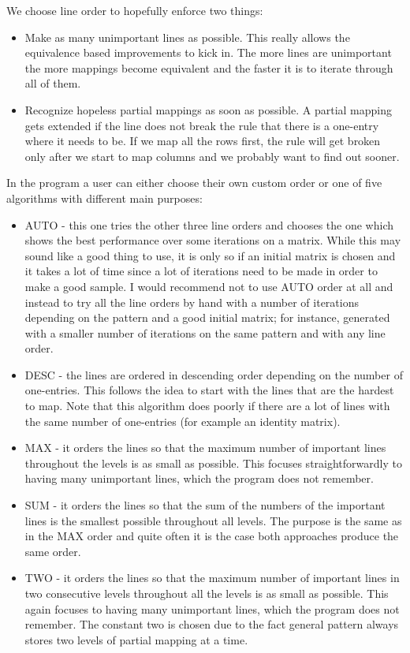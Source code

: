 We choose line order to hopefully enforce two things:
\begin{itemize}
\item Make as many unimportant lines as possible. This really allows the equivalence based improvements to kick in. The more lines are unimportant the more mappings become equivalent and the faster it is to iterate through all of them.
\item Recognize hopeless partial mappings as soon as possible. A partial mapping gets extended if the line does not break the rule that there is a one-entry where it needs to be. If we map all the rows first, the rule will get broken only after we start to map columns and we probably want to find out sooner.\\
\end{itemize}
In the program a user can either choose their own custom order or one of five algorithms with different main purposes:
\begin{itemize}
\item AUTO - this one tries the other three line orders and chooses the one which shows the best performance over some iterations on a matrix. While this may sound like a good thing to use, it is only so if an initial matrix is chosen and it takes a lot of time since a lot of iterations need to be made in order to make a good sample. I would recommend not to use AUTO order at all and instead to try all the line orders by hand with a number of iterations depending on the pattern and a good initial matrix; for instance, generated with a smaller number of iterations on the same pattern and with any line order.
\item DESC - the lines are ordered in descending order depending on the number of one-entries. This follows the idea to start with the lines that are the hardest to map. Note that this algorithm does poorly if there are a lot of lines with the same number of one-entries (for example an identity matrix).
\item MAX - it orders the lines so that the maximum number of important lines throughout the levels is as small as possible. This focuses straightforwardly to having many unimportant lines, which the program does not remember.
\item SUM - it orders the lines so that the sum of the numbers of the important lines is the smallest possible throughout all levels. The purpose is the same as in the MAX order and quite often it is the case both approaches produce the same order.
\item TWO - it orders the lines so that the maximum number of important lines in two consecutive levels throughout all the levels is as small as possible. This again focuses to having many unimportant lines, which the program does not remember. The constant two is chosen due to the fact general pattern always stores two levels of partial mapping at a time.
\end{itemize}

